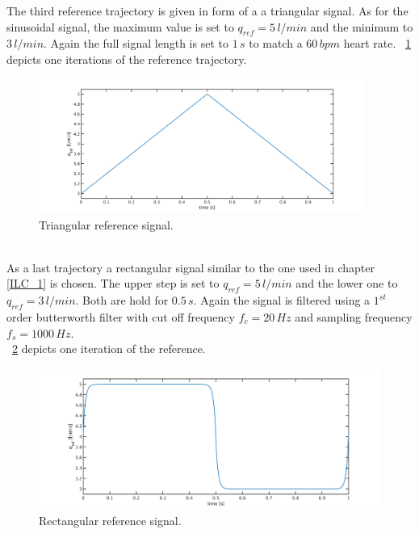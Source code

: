 The third reference trajectory is given in form of a a triangular signal. As for the sinusoidal signal, the maximum value is set to $q_{ref}=5\,l/min$ and the minimum to $3\, l/min$. Again the full signal length is set to $1\,s$ to match a $60\,bpm$ heart rate. \figurename~\ref{fig:ref_triang} depicts one iterations of the reference trajectory.
\begin{figure}[ht]
  \centering
  \includegraphics[width=0.95\textwidth]{images/chapt_5/ILC/ref_triang.pdf}
  \caption[Triangular reference signal]{Triangular reference signal.}
  \label{fig:ref_triang}
\end{figure}
\\As a last trajectory a rectangular signal similar to the one used in chapter \ref{ILC_1} is chosen. The upper step is set to $q_{ref}=5\,l/min$ and the lower one to $q_{ref}=3\,l/min$. Both are hold for $0.5\,s$. Again the signal is filtered using a $1^{st}$ order butterworth filter with cut off frequency $f_c=20\,Hz$ and sampling frequency $f_s=1000\,Hz$.
\\\figurename~\ref{fig:ref_square} depicts one iteration of the reference.
\begin{figure}[ht]
  \centering
  \includegraphics[width=\textwidth]{images/chapt_5/ILC/ref_square.pdf}
  \caption[Rectangular reference signal]{Rectangular reference signal.}
  \label{fig:ref_square}
\end{figure}
%


